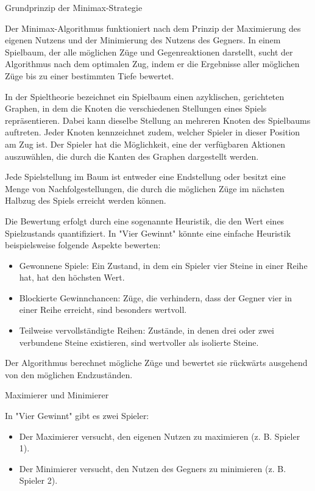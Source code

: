 Grundprinzip der Minimax-Strategie

Der Minimax-Algorithmus funktioniert nach dem Prinzip der Maximierung des eigenen Nutzens und der Minimierung des Nutzens des Gegners. In einem Spielbaum, der alle möglichen Züge und Gegenreaktionen darstellt, sucht der Algorithmus nach dem optimalen Zug, indem er die Ergebnisse aller möglichen Züge bis zu einer bestimmten Tiefe bewertet.

In der Spieltheorie bezeichnet ein Spielbaum einen azyklischen, gerichteten Graphen, in dem die Knoten die verschiedenen Stellungen eines Spiels repräsentieren. Dabei kann dieselbe Stellung an mehreren Knoten des Spielbaums auftreten. Jeder Knoten kennzeichnet zudem, welcher Spieler in dieser Position am Zug ist. Der Spieler hat die Möglichkeit, eine der verfügbaren Aktionen auszuwählen, die durch die Kanten des Graphen dargestellt werden.

Jede Spielstellung im Baum ist entweder eine Endstellung oder besitzt eine Menge von Nachfolgestellungen, die durch die möglichen Züge im nächsten Halbzug des Spiels erreicht werden können.

Die Bewertung erfolgt durch eine sogenannte Heuristik, die den Wert eines Spielzustands quantifiziert. In "Vier Gewinnt" könnte eine einfache Heuristik beispielsweise folgende Aspekte bewerten:

\begin{itemize}
	\item Gewonnene Spiele: Ein Zustand, in dem ein Spieler vier Steine in einer Reihe hat, hat den höchsten Wert.
	\item Blockierte Gewinnchancen: Züge, die verhindern, dass der Gegner vier in einer Reihe erreicht, sind besonders wertvoll.
	\item Teilweise vervollständigte Reihen: Zustände, in denen drei oder zwei verbundene Steine existieren, sind wertvoller als isolierte Steine.
\end{itemize}

Der Algorithmus berechnet mögliche Züge und bewertet sie rückwärts ausgehend von den möglichen Endzuständen.

Maximierer und Minimierer

In "Vier Gewinnt" gibt es zwei Spieler:

\begin{itemize}
	\item Der Maximierer versucht, den eigenen Nutzen zu maximieren (z. B. Spieler 1).
	\item Der Minimierer versucht, den Nutzen des Gegners zu minimieren (z. B. Spieler 2).
\end{itemize}


